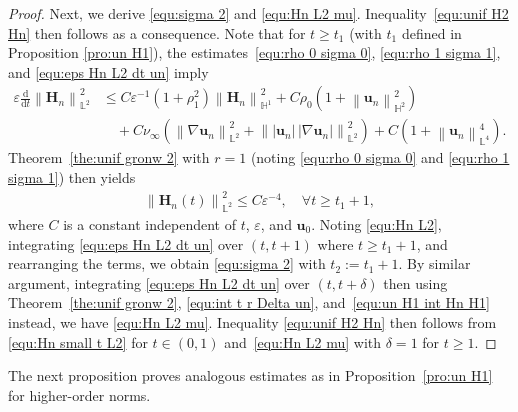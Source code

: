 \documentclass[11pt, reqno]{amsart}
\theoremstyle{definition}
\numberwithin{equation}{section}
\newcommand{\bff}{\boldsymbol}
\newcommand{\bb}{\mathbb}
\newcommand{\ddt}{\frac{\mathrm{d}}{\mathrm{d}t}}
\newcommand{\norm}[2]{\left\|{#1}\right\|_{#2}}
\begin{document}
\begin{proof}
	Next, we derive \eqref{equ:sigma 2} and \eqref{equ:Hn L2 mu}. Inequality~\eqref{equ:unif H2 Hn} then follows as a consequence. Note that for $t\geq t_1$ (with $t_1$ defined in Proposition \ref{pro:un H1}), the estimates~\eqref{equ:rho 0 sigma 0}, \eqref{equ:rho 1 sigma 1}, and \eqref{equ:eps Hn L2 dt un} imply
	\begin{align*}
		\varepsilon \ddt \norm{\bff{H}_n}{\bb{L}^2}^2
		&\leq 
		C\varepsilon^{-1} (1+\rho_1^2)  \norm{\bff{H}_n}{\bb{H}^1}^2
		+
		C\rho_0 \left(1+ \norm{\bff{u}_n}{\bb{H}^2}^2 \right)
		\\
		&\quad
		+
		C \nu_\infty \left( \norm{\nabla \bff{u}_n}{\bb{L}^2}^2
		+
		\norm{|\bff{u}_n|\, |\nabla \bff{u}_n|}{\bb{L}^2}^2 \right)
		+
		C\left(1+\norm{\bff{u}_n}{\bb{L}^4}^4\right).
	\end{align*}
	Theorem~\ref{the:unif gronw 2} with $r=1$ (noting \eqref{equ:rho 0 sigma 0} and \eqref{equ:rho 1 sigma 1}) then yields
	\begin{align}\label{equ:Hn L2}
		\norm{\bff{H}_n(t)}{\bb{L}^2}^2 \leq C\varepsilon^{-4}, 
		\quad \forall t\geq t_1+1,
	\end{align}
	where $C$ is a constant independent of $t$, $\varepsilon$, and $\bff{u}_0$.
	Noting \eqref{equ:Hn L2}, integrating \eqref{equ:eps Hn L2 dt un} over $(t,t+1)$ where $t\geq t_1+1$, and rearranging the terms, we obtain \eqref{equ:sigma 2} with $t_2:=t_1+1$.
	By similar argument, integrating \eqref{equ:eps Hn L2 dt un} over $(t,t+\delta)$ then using Theorem~\ref{the:unif gronw 2}, \eqref{equ:int t r Delta un}, and~\eqref{equ:un H1 int Hn H1} instead, we have \eqref{equ:Hn L2 mu}.
    Inequality \eqref{equ:unif H2 Hn} then follows from \eqref{equ:Hn small t L2} for $t\in (0,1)$ and~\eqref{equ:Hn L2 mu} with $\delta=1$ for $t\geq 1$.
\end{proof}

The next proposition proves analogous estimates as in Proposition~\ref{pro:un H1} for higher-order norms.
\end{document}
